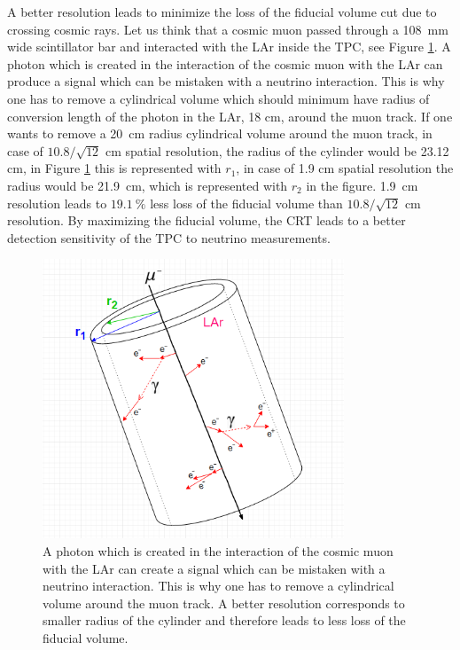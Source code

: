 \documentclass[a4paper]{article}\linespread{1.4}
\begin{document}
A better resolution leads to minimize the loss of the fiducial volume cut due to crossing cosmic rays.
Let us think that a cosmic muon passed through a 108~mm wide scintillator bar and interacted with the LAr inside the TPC, see Figure \ref{fig:cmp}. 
A photon which is created in the interaction of the cosmic muon with the LAr can produce a signal which can be mistaken with a neutrino interaction. This is why one has to remove a cylindrical volume which should minimum have radius of conversion length of the photon in the LAr, 18 cm, around the muon track. If one wants to remove a 20~cm radius cylindrical volume around the muon track, in case of $10.8/\sqrt{12}$ cm spatial resolution, the radius of the cylinder would be 23.12 cm, in Figure \ref{fig:cmp} this is represented with $r_{1}$, in case of 1.9 cm spatial resolution the radius would be 21.9~cm, which is represented with $r_{2}$ in the figure. 
1.9~cm resolution leads to $19.1~\%$ less loss of the fiducial volume than $10.8/\sqrt{12}$ cm resolution. By maximizing the fiducial volume, the CRT leads to a better detection sensitivity of the TPC to neutrino measurements.
\begin{figure}[h!] \hspace*{1.2cm} \includegraphics[width=90mm,scale=2.0]{figures/cmp.png} \caption{A photon which is created in the interaction of the cosmic muon with the LAr can create a signal which can be mistaken with a neutrino interaction. This is why one has to remove a cylindrical volume around the muon track. A better resolution corresponds to smaller radius of the cylinder and therefore leads to less loss of the fiducial volume.}  \label{fig:cmp}\end{figure}
\end{document}
